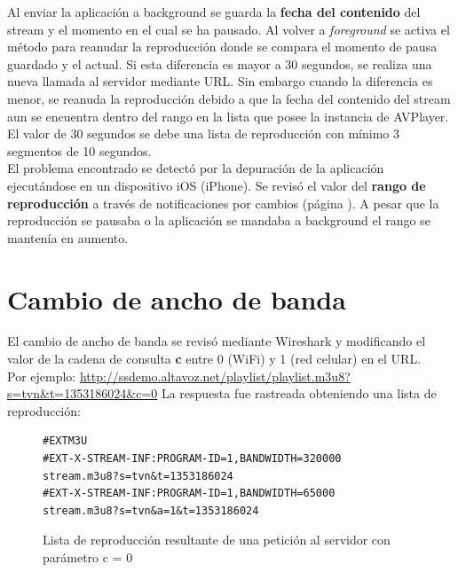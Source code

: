 Al enviar la aplicación a background se guarda la \textbf{fecha del contenido} del stream y el momento en el cual se ha pausado.
Al volver a \textit{foreground} se activa el método para reanudar la reproducción donde se compara el momento de pausa guardado y el actual. Si esta diferencia es mayor a 30 segundos, se realiza una nueva llamada al servidor mediante URL. Sin embargo cuando la diferencia es menor, se reanuda la reproducción debido a que la fecha del contenido del stream aun se encuentra dentro del rango en la lista que posee la instancia de AVPlayer.\\

El valor de 30 segundos se debe una lista de reproducción con mínimo 3 segmentos de 10 segundos.\\

El problema encontrado se detectó por la depuración de la aplicación ejecutándose en un dispositivo iOS (iPhone). Se revisó el valor del \textbf{rango de reproducción} a través de notificaciones por cambios (página \pageref{item:seekableTimeRanges}). A pesar que la reproducción se pausaba o la aplicación se mandaba a background el rango se mantenía en aumento.


\section{Cambio de ancho de banda}

El cambio de ancho de banda se revisó mediante Wireshark y modificando el valor de la cadena de consulta \textbf{c} entre 0 (WiFi) y 1 (red celular) en el URL.\\ 

Por ejemplo: \url{http://ssdemo.altavoz.net/playlist/playlist.m3u8?s=tvn&t=1353186024&c=0}
La respuesta fue rastreada obteniendo una lista de reproducción:

\begin{figure}[H]
	\centering
\begin{lstlisting}
#EXTM3U
#EXT-X-STREAM-INF:PROGRAM-ID=1,BANDWIDTH=320000
stream.m3u8?s=tvn&t=1353186024
#EXT-X-STREAM-INF:PROGRAM-ID=1,BANDWIDTH=65000
stream.m3u8?s=tvn&a=1&t=1353186024
\end{lstlisting}
\caption{Lista de reproducción resultante de una petición al servidor con parámetro c = 0}
\label{lst:playlistc0}
\end{figure}

